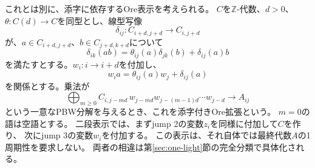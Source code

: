 \documentclass[11pt,a4paper]{ltjsarticle}
\theoremstyle{definition}
\begin{document}
これとは別に、添字に依存するOre表示を考えられる。
$C$を$\mathbb Z$-代数、$d>0$、$\theta:C(d)\to C$を同型とし、線型写像
\[
\delta_{ij}:C_{i+d,j+d}\longrightarrow C_{i,j+d}
\]
が、$a\in C_{i+d,j+d}$、$b\in C_{j+d,k+d}$について
\begin{equation}\label{genidx:eq:indexed-derivation}
\delta_{ik}(ab)=\theta_{ij}(a)\delta_{jk}(b)+\delta_{ij}(a)b
\end{equation}
を満たすとする。$w_i:i\to i+d$を付加し、
\[
w_i a=\theta_{ij}(a)w_j+\delta_{ij}(a)
\]
を関係とする。乗法が
\[
\bigoplus_{m\geq0}
C_{i,j-md}\,w_{j-md}w_{j-(m-1)d}\cdots w_{j-d}
\longrightarrow A_{ij}
\]
という一意なPBW分解を与えるとき、これを添字付きOre拡張という。
$m=0$の語は空語とする。
二段表示では、まずjump 2の変数$z_i$を同様に付加して$C$を作り、
次にjump 3の変数$w_i$を付加する。
この表示は、それ自体では最終代数$A$の1周期性を要求しない。
両者の相違は第\ref{sec:one-light}節の完全分類で具体化される。
\end{document}
